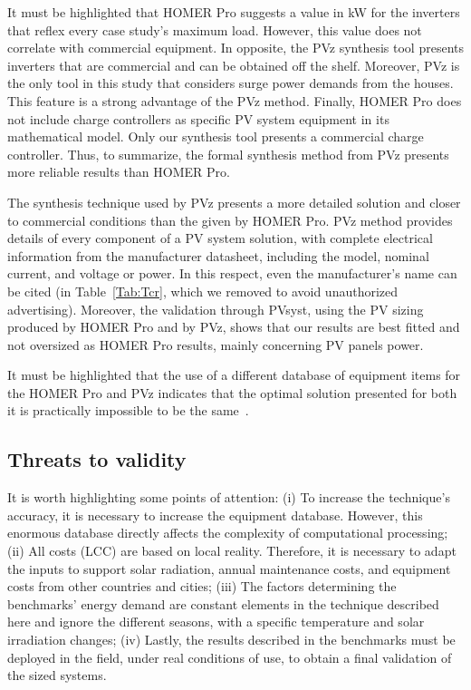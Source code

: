 \documentclass[journal]{IEEEtran}
\begin{document}
It must be highlighted that HOMER Pro suggests a value in kW for the inverters that reflex every case study's maximum load. However, this value does not correlate with commercial equipment. In opposite, the PVz synthesis tool presents inverters that are commercial and can be obtained off the shelf. Moreover, PVz is the only tool in this study that considers surge power demands from the houses. This feature is a strong advantage of the PVz method. Finally, HOMER Pro does not include charge controllers as specific PV system equipment in its mathematical model. Only our synthesis tool presents a commercial charge controller. Thus, to summarize, the formal synthesis method from PVz presents more reliable results than HOMER Pro.

The synthesis technique used by PVz presents a more detailed solution and closer to commercial conditions than the given by HOMER Pro. PVz method provides details of every component of a PV system solution, with complete electrical information from the manufacturer datasheet, including the model, nominal current, and voltage or power. In this respect, even the manufacturer's name can be cited (in Table~\ref{Tab:Tcr}, which we removed to avoid unauthorized advertising). Moreover, the validation through PVsyst, using the PV sizing produced by HOMER Pro and by PVz, shows that our results are best fitted and not oversized as HOMER Pro results, mainly concerning PV panels power.

It must be highlighted that the use of a different database of equipment items for the HOMER Pro and PVz indicates that the optimal solution presented for both it is practically impossible to be the same~\cite{Alsadi2018}. 

\subsection{Threats to validity} 

It is worth highlighting some points of attention: (i) To increase the technique's accuracy, it is necessary to increase the equipment database. However, this enormous database directly affects the complexity of computational processing; (ii) All costs (LCC) are based on local reality. Therefore, it is necessary to adapt the inputs to support solar radiation, annual maintenance costs, and equipment costs from other countries and cities; (iii) The factors determining the benchmarks' energy demand are constant elements in the technique described here and ignore the different seasons, with a specific temperature and solar irradiation changes; (iv) Lastly, the results described in the benchmarks must be deployed in the field, under real conditions of use, to obtain a final validation of the sized systems.
\end{document}
